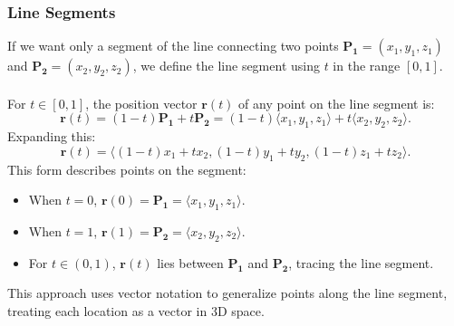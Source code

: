 \subsubsection*{Line Segments}

\noindent If we want only a segment of the line connecting two points \( \mathbf{P_1} = (x_1, y_1, z_1) \) and \( \mathbf{P_2} = (x_2, y_2, z_2) \), we define the line segment using \( t \) in the range \( [0, 1] \). \\ \\ For \( t \in [0, 1] \), the position vector \( \mathbf{r}(t) \) of any point on the line segment is:
\[
\mathbf{r}(t) = (1 - t) \mathbf{P_1} + t \mathbf{P_2} = (1 - t) \langle x_1, y_1, z_1 \rangle + t \langle x_2, y_2, z_2 \rangle.
\]
Expanding this:
\[
\mathbf{r}(t) = \langle (1 - t)x_1 + t x_2, (1 - t)y_1 + t y_2, (1 - t)z_1 + t z_2 \rangle.
\]
This form describes points on the segment:
\begin{itemize}
    \item When \( t = 0 \), \( \mathbf{r}(0) = \mathbf{P_1} = \langle x_1, y_1, z_1 \rangle \).
    \item When \( t = 1 \), \( \mathbf{r}(1) = \mathbf{P_2} = \langle x_2, y_2, z_2 \rangle \).
    \item For \( t \in (0, 1) \), \( \mathbf{r}(t) \) lies between \( \mathbf{P_1} \) and \( \mathbf{P_2} \), tracing the line segment.
\end{itemize}

\noindent This approach uses vector notation to generalize points along the line segment, treating each location as a vector in 3D space.


